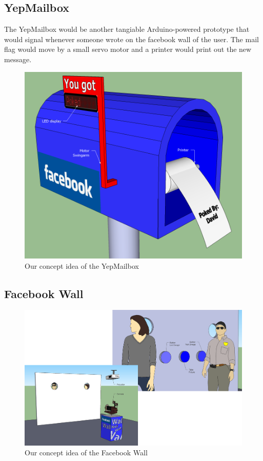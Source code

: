 \subsection{YepMailbox}
The YepMailbox would be another tangiable Arduino-powered prototype that would signal whenever someone wrote
on the facebook wall of the user. The mail flag would move by a small servo motor and a printer would print out the
new message.

\begin{figure}[h!]
\centering \includegraphics[scale=0.4]{img/prestudies-YepMailbox} \caption{Our concept idea of the YepMailbox}

\label{fig:prestudies-YepMailbox}
\end{figure}


\subsection{Facebook Wall}

\begin{figure}[h!]
\centering \includegraphics[scale=0.22]{img/prestudies-facebookwall} \caption{Our concept idea of the Facebook Wall}

\label{fig:prestudies-facebookwall}
\end{figure}

